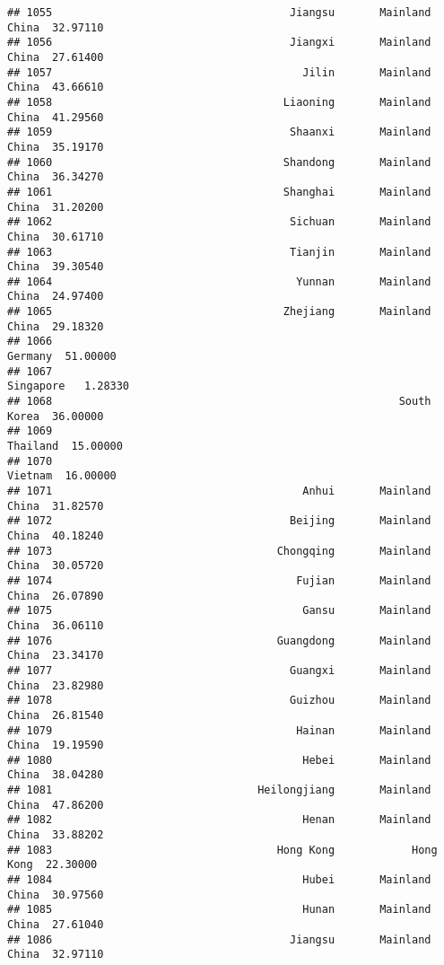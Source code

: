 \documentclass[
]{article}
\begin{document}
\begin{verbatim}
## 1055                                     Jiangsu       Mainland China  32.97110
## 1056                                     Jiangxi       Mainland China  27.61400
## 1057                                       Jilin       Mainland China  43.66610
## 1058                                    Liaoning       Mainland China  41.29560
## 1059                                     Shaanxi       Mainland China  35.19170
## 1060                                    Shandong       Mainland China  36.34270
## 1061                                    Shanghai       Mainland China  31.20200
## 1062                                     Sichuan       Mainland China  30.61710
## 1063                                     Tianjin       Mainland China  39.30540
## 1064                                      Yunnan       Mainland China  24.97400
## 1065                                    Zhejiang       Mainland China  29.18320
## 1066                                                          Germany  51.00000
## 1067                                                        Singapore   1.28330
## 1068                                                      South Korea  36.00000
## 1069                                                         Thailand  15.00000
## 1070                                                          Vietnam  16.00000
## 1071                                       Anhui       Mainland China  31.82570
## 1072                                     Beijing       Mainland China  40.18240
## 1073                                   Chongqing       Mainland China  30.05720
## 1074                                      Fujian       Mainland China  26.07890
## 1075                                       Gansu       Mainland China  36.06110
## 1076                                   Guangdong       Mainland China  23.34170
## 1077                                     Guangxi       Mainland China  23.82980
## 1078                                     Guizhou       Mainland China  26.81540
## 1079                                      Hainan       Mainland China  19.19590
## 1080                                       Hebei       Mainland China  38.04280
## 1081                                Heilongjiang       Mainland China  47.86200
## 1082                                       Henan       Mainland China  33.88202
## 1083                                   Hong Kong            Hong Kong  22.30000
## 1084                                       Hubei       Mainland China  30.97560
## 1085                                       Hunan       Mainland China  27.61040
## 1086                                     Jiangsu       Mainland China  32.97110

\end{verbatim}
\end{document}
